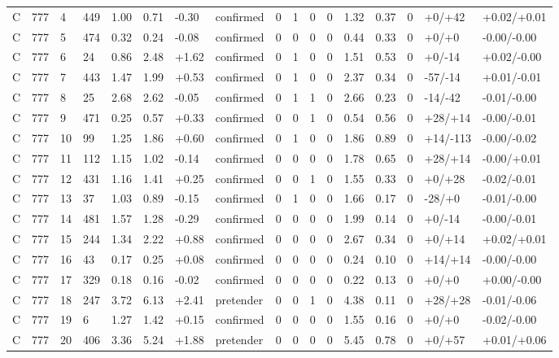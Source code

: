 \documentclass[11pt,a4paper]{article}
\begin{document}
{\begin{longtable}[]{@{}lllllllllllllllll@{}}
C & 777 & 4 & 449 & 1.00 & 0.71 & -0.30 & confirmed & 0 & 1 & 0 & 0 & 1.32 & 0.37 & 0 & +0/+42 & +0.02/+0.01 \\
C & 777 & 5 & 474 & 0.32 & 0.24 & -0.08 & confirmed & 0 & 0 & 0 & 0 & 0.44 & 0.33 & 0 & +0/+0 & -0.00/-0.00 \\
C & 777 & 6 & 24 & 0.86 & 2.48 & +1.62 & confirmed & 0 & 1 & 0 & 0 & 1.51 & 0.53 & 0 & +0/-14 & +0.02/-0.00 \\
C & 777 & 7 & 443 & 1.47 & 1.99 & +0.53 & confirmed & 0 & 1 & 0 & 0 & 2.37 & 0.34 & 0 & -57/-14 & +0.01/-0.01 \\
C & 777 & 8 & 25 & 2.68 & 2.62 & -0.05 & confirmed & 0 & 1 & 1 & 0 & 2.66 & 0.23 & 0 & -14/-42 & -0.01/-0.00 \\
C & 777 & 9 & 471 & 0.25 & 0.57 & +0.33 & confirmed & 0 & 0 & 1 & 0 & 0.54 & 0.56 & 0 & +28/+14 & -0.00/-0.01 \\
C & 777 & 10 & 99 & 1.25 & 1.86 & +0.60 & confirmed & 0 & 1 & 0 & 0 & 1.86 & 0.89 & 0 & +14/-113 & -0.00/-0.02 \\
C & 777 & 11 & 112 & 1.15 & 1.02 & -0.14 & confirmed & 0 & 0 & 0 & 0 & 1.78 & 0.65 & 0 & +28/+14 & -0.00/+0.01 \\
C & 777 & 12 & 431 & 1.16 & 1.41 & +0.25 & confirmed & 0 & 0 & 1 & 0 & 1.55 & 0.33 & 0 & +0/+28 & -0.02/-0.01 \\
C & 777 & 13 & 37 & 1.03 & 0.89 & -0.15 & confirmed & 0 & 1 & 0 & 0 & 1.66 & 0.17 & 0 & -28/+0 & -0.01/-0.00 \\
C & 777 & 14 & 481 & 1.57 & 1.28 & -0.29 & confirmed & 0 & 0 & 0 & 0 & 1.99 & 0.14 & 0 & +0/-14 & -0.00/-0.01 \\
C & 777 & 15 & 244 & 1.34 & 2.22 & +0.88 & confirmed & 0 & 0 & 0 & 0 & 2.67 & 0.34 & 0 & +0/+14 & +0.02/+0.01 \\
C & 777 & 16 & 43 & 0.17 & 0.25 & +0.08 & confirmed & 0 & 0 & 0 & 0 & 0.24 & 0.10 & 0 & +14/+14 & -0.00/-0.00 \\
C & 777 & 17 & 329 & 0.18 & 0.16 & -0.02 & confirmed & 0 & 0 & 0 & 0 & 0.22 & 0.13 & 0 & +0/+0 & +0.00/-0.00 \\
C & 777 & 18 & 247 & 3.72 & 6.13 & +2.41 & pretender & 0 & 0 & 1 & 0 & 4.38 & 0.11 & 0 & +28/+28 & -0.01/-0.06 \\
C & 777 & 19 & 6 & 1.27 & 1.42 & +0.15 & confirmed & 0 & 0 & 0 & 0 & 1.55 & 0.16 & 0 & +0/+0 & -0.02/-0.00 \\
C & 777 & 20 & 406 & 3.36 & 5.24 & +1.88 & pretender & 0 & 0 & 0 & 0 & 5.45 & 0.78 & 0 & +0/+57 & +0.01/+0.06 \\
\end{longtable}
}
\endgroup
\end{document}
